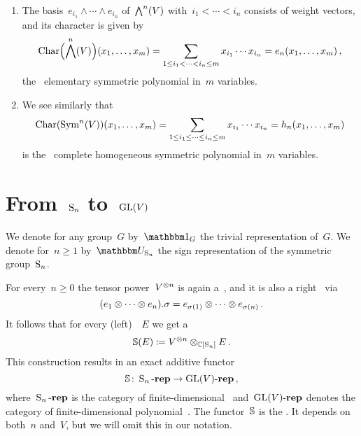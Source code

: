 \documentclass[a4paper,10pt]{scrartcl}
\begin{document}
\begin{example}
  \leavevmode
  \begin{enumerate}
    \item
      The basis~$e_{i_1} \wedge \dotsb \wedge e_{i_n}$ of~$\bigwedge^n(V)$ with~$i_1 < \dotsb < i_n$ consists of weight vectors, and its character is given by
      \[
        \operatorname{Char}\Bigl( \bigwedge^n(V) \Bigr)(x_1, \dotsc, x_m)
        =
        \sum_{1 \leq i_1 < \dotsb < i_n \leq m} x_{i_1} \dotsb x_{i_n}
        =
        e_n(x_1, \dotsc, x_m) \,,
      \]
      the~{} elementary symmetric polynomial in~$m$ variables.
    \item
      We see similarly that
      \[
        \operatorname{Char}(\operatorname{Sym}^n(V))(x_1, \dotsc, x_m)
        =
        \sum_{1 \leq i_1 \leq \dotsb \leq i_n \leq m} x_{i_1} \dotsb x_{i_n}
        =
        h_n(x_1, \dotsc, x_m)
      \]
      is the~{} complete homogeneous symmetric polynomial in~$m$ variables.
  \end{enumerate}
\end{example}





\section{From~$\operatorname{S}_n$ to~$\operatorname{GL}(V)$}

We denote for any group~$G$ by~$\trivrep_G$ the trivial representation of~$G$.
We denote for~$n \geq 1$ by~$\signrep_{\symm_n}$ the sign representation of the symmetric group~$\operatorname{S}_n$.

For every~$n \geq 0$ the tensor power~$V^{\otimes n}$ is again a~{}, and it is also a right~{} via
\[
  (e_1 \otimes \dotsb \otimes e_n) . \sigma
  =
  e_{\sigma(1)} \otimes \dotsb \otimes e_{\sigma(n)} \,.
\]
It follows that for every (left)~{}~$E$ we get a~{}
\[
  \mathbb{S}(E)
  \coloneqq
  V^{\otimes n} \otimes_{\mathbb{C}[\operatorname{S}_n]} E \,.
\]
This construction results in an exact additive functor
\[
  \mathbb{S}
  \colon
  \operatorname{S}_n\text{-}\mathbf{rep}
  \to
  \operatorname{GL}(V)\text{-}\mathbf{rep} \,,
\]
where~$\operatorname{S}_n\text{-}\mathbf{rep}$ is the category of finite-dimensional~{} and~$\operatorname{GL}(V)\text{-}\mathbf{rep}$ denotes the category of finite-dimensional polynomial~{}. 
The functor~$\mathbb{S}$ is the .
It depends on both~$n$ and~$V$, but we will omit this in our notation.
\end{document}
